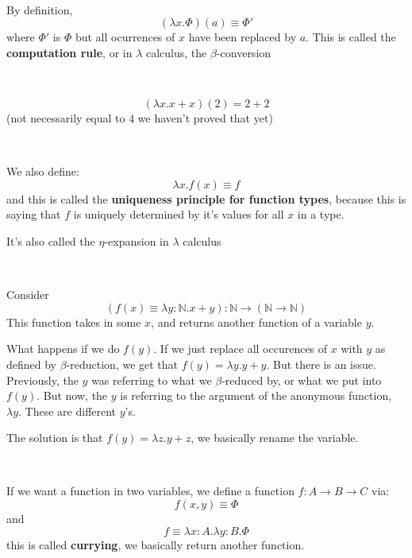 \documentclass{article}
\begin{document}
\begin{definition}
\

By definition, $$(\lambda x. \Phi)(a) \equiv \Phi'$$where $\Phi'$ is $\Phi$ but all ocurrences of $x$ have been replaced by $a$. This is called the \textbf{computation rule}, or in $\lambda$ calculus, the $\beta$-conversion
\end{definition}

\begin{example}
\

$$(\lambda x. x+x)(2) = 2 + 2 $$(not necessarily equal to $4$ we haven't proved that yet)
\end{example}

\begin{definition}
\

We also define: $$\lambda x.f(x) \equiv f$$and this is called the \textbf{uniqueness principle for function types}, because this is saying that $f$ is uniquely determined by it's values for all $x$ in a type. 

It's also called the $\eta$-expansion in $\lambda$ calculus
\end{definition}

\begin{remark}
\

Consider $$(f(x) \equiv \lambda y:\mathbb{N}. x+y): \mathbb{N} \to (\mathbb{N} \to \mathbb{N})$$This function takes in some $x$, and returns another function of a variable $y$.

What happens if we do $f(y)$. If we just replace all occurences of $x$ with $y$ as defined by $\beta$-reduction, we get that $f(y) = \lambda y. y+y$. But there is an issue. Previously, the $y$ was referring to what we $\beta$-reduced by, or what we put into $f(y)$. But now, the $y$ is referring to the argument of the anonymous function, $\lambda y$. These are different $y$'s.

The solution is that $f(y) = \lambda z. y+z$, we basically rename the variable.
\end{remark}

\begin{definition}[Currying]
\

If we want a function in two variables, we define a function $f: A \to B \to C$ via: $$f(x,y) \equiv \Phi$$and $$f \equiv \lambda x:A. \lambda y:B. \Phi$$this is called \textbf{currying}, we basically return another function. 
\end{definition}
\end{document}
